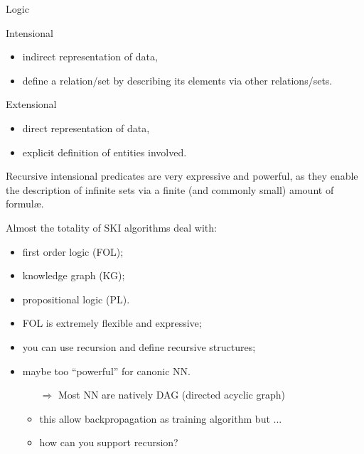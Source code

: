 \documentclass[presentation]{beamer}\mode<presentation>{\usetheme{AMSBolognaFC}}
\begin{document}
\begin{frame}[allowframebreaks]{Logic}
    \begin{block}{Intensional}
        \begin{itemize}
            \item indirect representation of data,
            \item define a relation/set by describing its elements via other relations/sets.
        \end{itemize}
    \end{block}
    \begin{block}{Extensional}
        \begin{itemize}
            \item direct representation of data,
            \item explicit definition of entities involved.
        \end{itemize}
    \end{block}
    
    Recursive intensional predicates are very expressive and powerful, as they enable the description of infinite sets via a finite (and commonly small) amount of formul\ae.
    
    \framebreak        
    
    Almost the totality of SKI algorithms deal with:
    \begin{itemize}
        \item \alert{first order logic} (FOL);
        \item \alert{knowledge graph} (KG);
        \item \alert{propositional logic} (PL).
        
    \end{itemize}
    
    \framebreak
    
    \begin{itemize}
        \item FOL is extremely flexible and expressive;
        \item you can use recursion and define recursive structures;
        \item maybe too ``powerful'' for canonic NN.
        \begin{itemize}
            \item[$\Rightarrow$] Most NN are natively DAG (directed acyclic graph)
            \item this allow backpropagation as training algorithm but ...
            \item how can you support recursion?  
        \end{itemize}
    \end{itemize}
    \centering
    \phantom{You can't!}
    \phantom{Unless you use some tricks.}
    

\end{frame}
\end{document}
